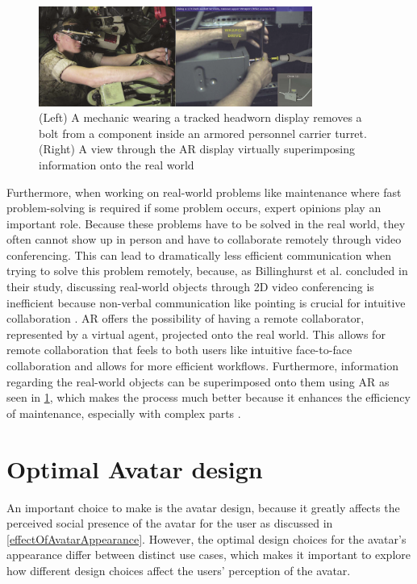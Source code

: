 \begin{figure}[H]
\centering
\includegraphics[width = 0.8\textwidth]{figures/ARmaintenance}
\caption[test]{(Left) A mechanic wearing a tracked headworn display removes a bolt from a component inside an armored personnel carrier turret. (Right) A view through the AR display virtually superimposing information onto the real world}
\label{fig::maintenance}
\end{figure}

Furthermore, when working on real-world problems like maintenance where fast problem-solving is required if some problem occurs, expert opinions play an important role. Because these problems have to be solved in the real world, they often cannot show up in person and have to collaborate remotely through video conferencing. This can lead to dramatically less efficient communication when trying to solve this problem remotely, because, as Billinghurst et al. concluded in their study, discussing real-world objects through 2D video conferencing is inefficient because non-verbal communication like pointing is crucial for intuitive collaboration \cite{CollaborativeAR}. AR offers the possibility of having a remote collaborator, represented by a virtual agent, projected onto the real world. This allows for remote collaboration that feels to both users like intuitive face-to-face collaboration and allows for more efficient workflows. Furthermore, information regarding the real-world objects can be superimposed onto them using AR as seen in \ref{fig::maintenance}, which makes the process much better because it enhances the efficiency of maintenance, especially with complex parts \cite{5620905}.

\section{Optimal Avatar design}
An important choice to make is the avatar design, because it greatly affects the perceived social presence of the avatar for the user as discussed in \ref{effectOfAvatarAppearance}. However, the optimal design choices for the avatar's appearance differ between distinct use cases, which makes it important to explore how different design choices affect the users' perception of the avatar.

